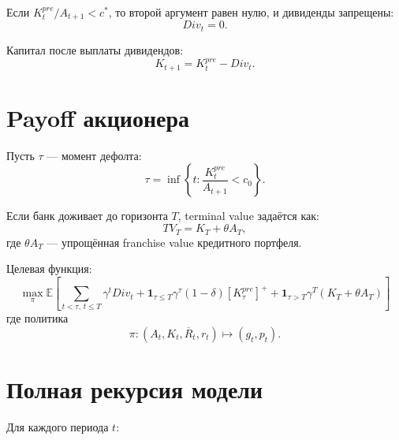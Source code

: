 \documentclass[11pt,a4paper]{article}
\newcommand{\1}{\mathbf{1}}
\newcommand{\E}{\mathbb{E}}
\newcommand{\pos}[1]{\left[#1\right]^+}
\begin{document}
Если $K_t^{pre}/A_{t+1}<c^*$, то второй аргумент равен нулю, и дивиденды запрещены:
\begin{equation}
    Div_t=0.
\end{equation}

Капитал после выплаты дивидендов:
\begin{equation}
    K_{t+1}=K_t^{pre}-Div_t.
\end{equation}

\section{Payoff акционера}

Пусть $\tau$ --- момент дефолта:
\begin{equation}
    \tau = \inf\left\{t: \frac{K_t^{pre}}{A_{t+1}}<c_0\right\}.
\end{equation}

Если банк доживает до горизонта $T$, terminal value задаётся как:
\begin{equation}
    TV_T = K_T + \theta A_T,
\end{equation}
где $\theta A_T$ --- упрощённая franchise value кредитного портфеля.

Целевая функция:
\begin{equation}
\boxed{
    \max_{\pi}
    \E\left[
        \sum_{t<\tau,\,t\le T} \gamma^t Div_t
        +
        \1_{\tau\le T}\gamma^\tau (1-\delta)\pos{K_\tau^{pre}}
        +
        \1_{\tau>T}\gamma^T(K_T+\theta A_T)
    \right]
}
\end{equation}
где политика
\begin{equation}
    \pi: (A_t,K_t,\overline{R}_t,r_t)\mapsto (g_t,p_t).
\end{equation}

\section{Полная рекурсия модели}

Для каждого периода $t$:
\end{document}
